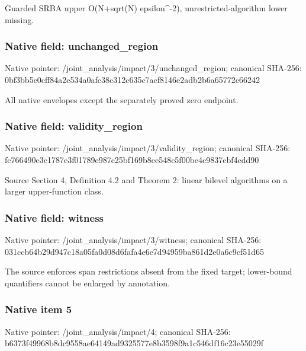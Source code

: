 \documentclass[10pt,a4paper]{article}
\begin{document}
\begingroup\raggedright\sloppy Guarded SRBA upper O(N+sqrt(N) epsilon\textasciicircum{}-2),\allowbreak{} unrestricted-algorithm lower missing.\par\endgroup

\subsubsection{Native field: unchanged\_\allowbreak{}region}
Native pointer: /joint\_\allowbreak{}analysis/impact/3/unchanged\_\allowbreak{}region; canonical SHA-256: 0bf3bb5e0cff84a2e534a0afc38c312c635c7acf8146e2adb2b6a65772c66242

\begingroup\raggedright\sloppy All native envelopes except the separately proved zero endpoint.\par\endgroup

\subsubsection{Native field: validity\_\allowbreak{}region}
Native pointer: /joint\_\allowbreak{}analysis/impact/3/validity\_\allowbreak{}region; canonical SHA-256: fc766490e3c1787e3f01789e987c25bf169b8ee548c5f00be4c9837ebf4edd90

\begingroup\raggedright\sloppy Source Section 4,\allowbreak{} Definition 4.2 and Theorem 2:\allowbreak{} linear bilevel algorithms on a larger upper-function class.\par\endgroup

\subsubsection{Native field: witness}
Native pointer: /joint\_\allowbreak{}analysis/impact/3/witness; canonical SHA-256: 031ccb64b29d947c18a05fa0d08d6fafa4e6e7d94959ba861d2e0a6c9cf51d65

\begingroup\raggedright\sloppy The source enforces span restrictions absent from the fixed target;\allowbreak{} lower-bound quantifiers cannot be enlarged by annotation.\par\endgroup

\subsubsection{Native item 5}
Native pointer: /joint\_\allowbreak{}analysis/impact/4; canonical SHA-256: b6373f49968b8dc9558ae64149ad9325577e8b3598f9a1c546df16c23e55029f
\end{document}
